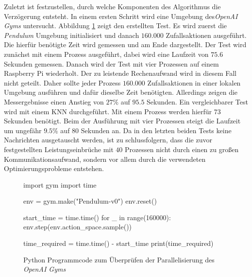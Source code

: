 Zuletzt ist festzustellen, durch welche Komponenten des Algorithmus die Verzögerung entsteht. In einem ersten Schritt wird eine Umgebung des\emph{OpenAI Gyms} untersucht. Abbildung \ref{fig:test_bottleneck} zeigt den erstellten Test. Es wird zuerst die \emph{Pendulum} Umgebung initialisiert und danach $160.000$ Zufallsaktionen ausgeführt. Die hierfür benötigte Zeit wird gemessen und am Ende dargestellt. Der Test wird zunächst mit einem Prozess ausgeführt, dabei wird eine Laufzeit von $75.6$ Sekunden gemessen. Danach wird der Test mit vier Prozessen auf einem Raspberry Pi wiederholt. Der zu leistende Rechenaufwand wird in diesem Fall nicht geteilt. Daher sollte jeder Prozess $160.000$ Zufallsaktionen in einer lokalen Umgebung ausführen und dafür dieselbe Zeit benötigten. Allerdings zeigen die Messergebnisse einen Anstieg von $27\%$ auf $95.5$ Sekunden. Ein vergleichbarer Test wird mit einem \ac{KNN} durchgeführt. Mit einem Prozess werden hierfür $73$ Sekunden benötigt. Beim der Ausführung mit vier Prozessen steigt die Laufzeit um ungefähr $9.5\%$ auf 80 Sekunden an. Da in den letzten beiden Tests keine Nachrichten ausgetauscht werden, ist zu schlussfolgern, dass die zuvor festgestellten Leistungseinbrüche mit $40$ Prozessen nicht durch einen zu großen Kommunikationsaufwand, sondern vor allem durch die verwendeten Optimierungsprobleme entstehen. 
\begin{figure}
	\begin{python}
		import gym
		import time
		
		env = gym.make("Pendulum-v0")
		env.reset()
		
		start_time = time.time()
		for _ in range(160000):
			env.step(env.action_space.sample())
		
		time_required = time.time() - start_time
		print(time_required)
	\end{python}
	\label{fig:test_bottleneck}
	\caption{Python Programmcode zum Überprüfen der Parallelisierung des \emph{OpenAI Gyms}}
\end{figure} 


